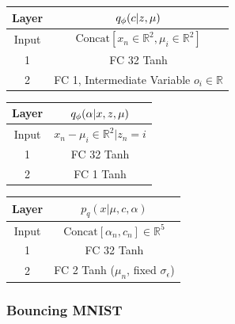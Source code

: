 \documentclass[anonymous=false, %
               format=acmsmall, %
               review=true, %
               screen=true, %
               nonacm=true]{acmart}
\theoremstyle{definition}
\begin{document}
\begin{table}[h]
    \centering
    \begin{tabular}{c|c}
    \toprule
        \textbf{Layer} &
        $q_\phi(c | z, \mu)$ \\
    \midrule
    Input  
    & 
    $\mathrm{Concat}[x_n\in\mathbb{R}^2, \mu_i\in\mathbb{R}^2]$\\
    \hline 
    1  
    & 
    FC 32 Tanh\\
    \hline 
    2
    & 
    \parbox{4cm}{FC 1, Intermediate Variable $o_i\in\mathbb{R}$} \\
     & 
    \parbox{4cm}{$\mathrm{Concat}[o_i\in\mathbb{R}]$, Softmax ($c_n$)} \\
    \bottomrule
    \end{tabular}
    \label{arch-dgmm-assignment}
\end{table}

\begin{table}[h]
    \centering
    \begin{tabular}{c|c}
    \toprule
        \textbf{Layer} &
        $q_\phi(\alpha | x, z, \mu)$ \\
    \midrule
    Input  
    & 
    $x_n - \mu_i \in\mathbb{R}^2 | z_n = i$\\
    \hline 
    1  
    & 
    FC 32 Tanh\\
    \hline 
    2
    & 
    \parbox{4cm}{FC 1 Tanh} \\
    \bottomrule
    \end{tabular}
    \label{arch-dgmm-angle}
\end{table} 

\begin{table}[h]
    \centering
    \begin{tabular}{c|c}
    \toprule
    \textbf{Layer}
    &
    $p_q(x | \mu, c, \alpha)$ \\
    \midrule
    Input
    &
    $\mathrm{Concat}[\alpha_n, c_n]\in\mathbb{R}^5$ 
    \\
    \hline
    1
    &
    FC 32 Tanh \\
    \hline
    2
    &
    FC 2 Tanh ($\mu_n$, fixed $\sigma_\epsilon$)\\
    \bottomrule
    \end{tabular}
    \label{arch-dgmm-decoder}
\end{table}
\newpage
\subsubsection{Bouncing MNIST}
\end{document}

